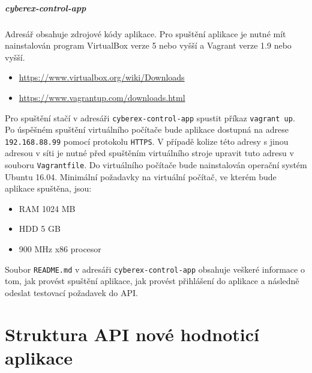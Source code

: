\documentclass[
  digital,
  twoside,
  table, 
  nolof, 
  nolot
]{fithesis3}
\begin{document}
\paragraph{cyberex-control-app} Adresář obsahuje zdrojové kódy aplikace. Pro spuštění aplikace je nutné mít nainstalován program VirtualBox verze 5 nebo vyšší a Vagrant verze 1.9 nebo vyšší.
\begin{itemize}
    \item \url{https://www.virtualbox.org/wiki/Downloads}
    \item \url{https://www.vagrantup.com/downloads.html}
\end{itemize}
Pro spuštění stačí v adresáři \texttt{cyberex-control-app} spustit příkaz \texttt{vagrant up}.
Po úspěšném spuštění virtuálního počítače bude aplikace dostupná na adrese
\texttt{192.168.88.99} pomocí protokolu \texttt{HTTPS}. V případě kolize této adresy s jinou adresou v síti je nutné
před spuštěním virtuálního stroje upravit tuto adresu v souboru \texttt{Vagrantfile}.
Do virtuálního počítače bude nainstalován operační systém Ubuntu 16.04.
Minimální požadavky na virtuální počítač, ve kterém bude aplikace spuštěna,
jsou:
\begin{itemize}
    \item RAM 1024 MB
    \item HDD 5 GB
    \item 900 MHz x86 procesor
\end{itemize}
Soubor \texttt{README.md} v adresáři \texttt{cyberex-control-app} obsahuje veškeré informace o tom, jak provést spuštění aplikace, jak provést přihlášení do aplikace a následně odeslat testovací požadavek do API.

\chapter{Struktura API nové hodnoticí aplikace}
\label{appendAPI}
\end{document}
